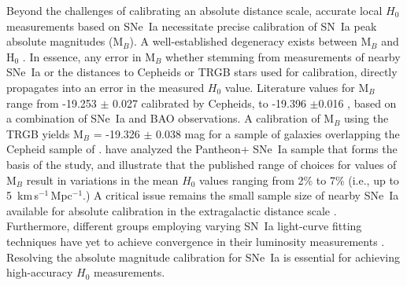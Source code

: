\documentclass[12pt,modern]{aastex631}
\newcommand{\ho}{$H_{0}$\xspace}
\newcommand{\hounits}{\,km\,s$^{-1}$\,Mpc$^{-1}$\xspace}
\newcommand{\sne}{SNe~Ia\xspace}
\newcommand{\sn}{SN~Ia\xspace}
\begin{document}
Beyond the challenges of calibrating an absolute distance scale, accurate local \ho measurements  based on \sne necessitate precise calibration of \sn peak absolute magnitudes (M$_B$). 
A well-established degeneracy exists between M$_B$ and H$_0$ \citep[e.g.,][]{efstathiou_2021, dainotti_2025}. In essence, any error in M$_B$ whether stemming from measurements of nearby \sne or the distances to Cepheids or TRGB stars used for calibration, directly propagates into an error in the measured \ho value. Literature values for M$_B$ range from -19.253 $\pm$ 0.027 \citep{riess_2022} calibrated by Cepheids,  to -19.396 $\pm$0.016 \citep{dinda_banerjee_2023}, based on a combination of \sne and BAO observations. A calibration of M$_B$ using the TRGB yields M$_B$ = -19.326 $\pm$ 0.038 mag \citep{freedman_2019} for a sample of galaxies overlapping the Cepheid sample of \citet{riess_2016}. \citet{chen_2024} have analyzed the Pantheon+ \sne sample that forms the basis of the \citet{riess_2022} study, and illustrate that the published range of choices for values of M$_B$ result in variations in the mean \ho values ranging from 2\% to 7\% (i.e.,  up to 5 \hounits.) A critical issue remains the small sample size of nearby \sne available for absolute calibration in  the extragalactic distance scale \citep{riess_2022}. Furthermore, different groups employing varying \sn light-curve fitting techniques have yet to achieve convergence in their luminosity measurements \citep[e.g.,][and references therein]{vincenzi_2025}. Resolving the absolute magnitude calibration for \sne is essential for achieving high-accuracy \ho measurements.

\rm
\end{document}
